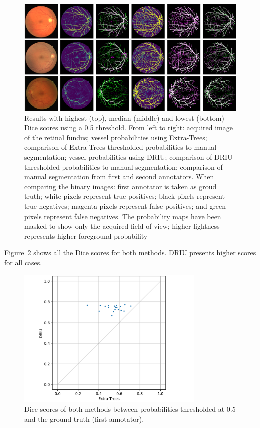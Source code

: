 \begin{figure}
  \includegraphics[width=\textwidth]{figures/collage}
  \caption{Results with highest (top), median (middle) and lowest (bottom) Dice scores using a 0.5 threshold. From left to right: acquired image of the retinal fundus; vessel probabilities using Extra-Trees; comparison of Extra-Trees thresholded probabilities to manual segmentation; vessel probabilities using DRIU; comparison of DRIU thresholded probabilities to manual segmentation; comparison of manual segmentation from first and second annotators. When comparing the binary images: first annotator is taken as groud truth; white pixels represent true positives; black pixels represent true negatives; magenta pixels represent false positives; and green pixels represent false negatives. The probability maps have been masked to show only the acquired field of view; higher lightness represents higher foreground probability}
  \label{fig:collage}
\end{figure}

Figure~\ref{fig:dice} shows all the Dice scores for both methods. DRIU presents higher scores for all cases.

\begin{figure}
  \centering
  \includegraphics[width=0.8\textwidth]{figures/dices}
  \caption{Dice scores of both methods between probabilities thresholded at 0.5 and the ground truth (first annotator).}
  \label{fig:dice}
\end{figure}

